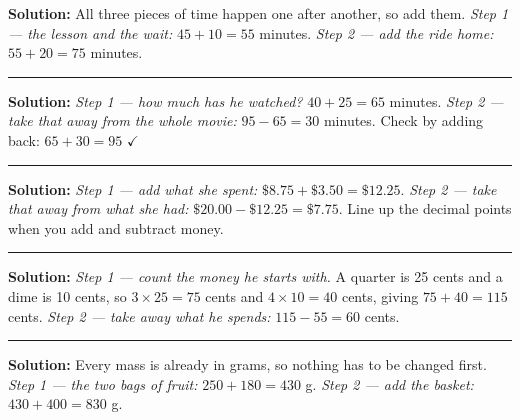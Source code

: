 \documentclass[12pt]{article}
\begin{document}




\textbf{Solution:} All three pieces of time happen one after another, so add them.
\emph{Step 1 --- the lesson and the wait:} $45 + 10 = 55$ minutes.
\emph{Step 2 --- add the ride home:} $55 + 20 = 75$ minutes.

\vspace{0.2cm}\noindent\rule{\linewidth}{0.2pt}


\textbf{Solution:} \emph{Step 1 --- how much has he watched?} $40 + 25 = 65$ minutes.
\emph{Step 2 --- take that away from the whole movie:} $95 - 65 = 30$ minutes.
Check by adding back: $65 + 30 = 95$ $\checkmark$

\vspace{0.2cm}\noindent\rule{\linewidth}{0.2pt}


\textbf{Solution:} \emph{Step 1 --- add what she spent:}
$\$8.75 + \$3.50 = \$12.25$.
\emph{Step 2 --- take that away from what she had:} $\$20.00 - \$12.25 = \$7.75$.
Line up the decimal points when you add and subtract money.

\vspace{0.2cm}\noindent\rule{\linewidth}{0.2pt}


\textbf{Solution:} \emph{Step 1 --- count the money he starts with.} A quarter is
25 cents and a dime is 10 cents, so
$3 \times 25 = 75$ cents and $4 \times 10 = 40$ cents, giving $75 + 40 = 115$ cents.
\emph{Step 2 --- take away what he spends:} $115 - 55 = 60$ cents.

\vspace{0.2cm}\noindent\rule{\linewidth}{0.2pt}


\textbf{Solution:} Every mass is already in grams, so nothing has to be changed first.
\emph{Step 1 --- the two bags of fruit:} $250 + 180 = 430$ g.
\emph{Step 2 --- add the basket:} $430 + 400 = 830$ g.
\end{document}
